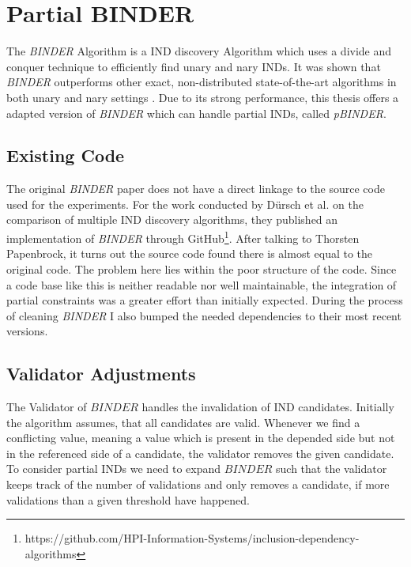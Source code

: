 \section{Partial BINDER}
The \textit{BINDER} Algorithm \cite{papenbrock2015divide} is a IND discovery Algorithm which uses a divide and conquer technique to efficiently find unary and nary INDs. It was shown that \textit{BINDER} outperforms other exact, non-distributed state-of-the-art algorithms in both unary and nary settings \cite{dursch2019inclusion}. Due to its strong performance, this thesis offers a adapted version of \textit{BINDER} which can handle partial INDs, called \textit{pBINDER}.

\subsection{Existing Code}
The original \textit{BINDER} paper does not have a direct linkage to the source code used for the experiments. For the work conducted by Dürsch et al. on the comparison of multiple IND discovery algorithms\cite{dursch2019inclusion}, they published an implementation of \textit{BINDER} through GitHub\footnote{https://github.com/HPI-Information-Systems/inclusion-dependency-algorithms}. After talking to Thorsten Papenbrock, it turns out the source code found there is almost equal to the original code. The problem here lies within the poor structure of the code. Since a code base like this is neither readable nor well maintainable, the integration of partial constraints was a greater effort than initially expected. During the process of cleaning \textit{BINDER} I also bumped the needed dependencies to their most recent versions.

\subsection{Validator Adjustments}
The Validator of $BINDER$ handles the invalidation of IND candidates. Initially the algorithm assumes, that all candidates are valid. Whenever we find a conflicting value, meaning a value which is present in the depended side but not in the referenced side of a candidate, the validator removes the given candidate. To consider partial INDs we need to expand $BINDER$ such that the validator keeps track of the number of validations and only removes a candidate, if more validations than a given threshold have happened.

